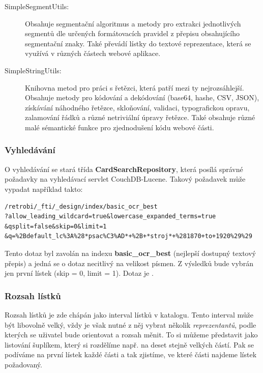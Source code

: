 \begin{description}
\item[SimpleSegmentUtils:]{Obsahuje segmentační algoritmus a metody pro extrakci jednotlivých segmentů dle určených formátovacích pravidel z přepisu obsahujícího segmentační znaky. Také převádí lístky do textové reprezentace, která se využívá v různých částech webové aplikace.}
\item[SimpleStringUtils:]{Knihovna metod pro práci s řetězci, která patří mezi ty nejrozsáhlejší. Obsahuje metody pro kódování a dekódování (base64, hashe, CSV, JSON), získávání náhodného řetězce, skloňování, validaci, typografickou opravu, zalamování řádků a různé netriviální úpravy řetězce. Také obsahuje různé malé sémantické funkce pro zjednodušení kódu webové části.}
\end{description}

\subsubsection{Vyhledávání}

O vyhledávání se stará třída {\bf CardSearchRepository}, která posílá správné požadavky na vyhledávací servlet CouchDB-Lucene. Takový požadavek může vypadat například takto:

\begin{verbatim}
/retrobi/_fti/_design/index/basic_ocr_best
?allow_leading_wildcard=true&lowercase_expanded_terms=true
&qsplit=false&skip=0&limit=1
&q=%2Bdefault_lc%3A%28*psac%C3%AD*+%2B+*stroj*+%281870+to+1920%29%29
\end{verbatim}

Tento dotaz byl zavolán na indexu {\bf basic\_ocr\_best} (nejlepší dostupný textový přepis) a jedná se o dotaz necitlivý na velikost písmen. Z výsledků bude vybrán jen první lístek (skip = 0, limit = 1). Dotaz je .

\subsubsection{Rozsah lístků}

Rozsah lístků je zde chápán jako interval lístků v katalogu. Tento interval může být libovolně velký, vždy je však nutné z něj vybrat několik {\em reprezentantů}, podle kterých se uživatel bude orientovat a rozsah měnit. To si můžeme představit jako listování šuplíkem, který si rozdělíme např. na deset stejně velkých částí. Pak se podíváme na první lístek každé části a tak zjistíme, ve které části najdeme lístek požadovaný. 

